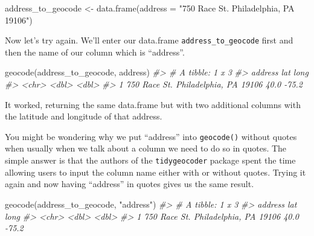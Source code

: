 \documentclass[
]{krantz}
\makeatletter
\newenvironment{Shaded}{\begin{snugshade}}{\end{snugshade}}
\newcommand{\AttributeTok}[1]{\textcolor[rgb]{0.61,0.61,0.61}{#1}}
\newcommand{\CommentTok}[1]{\textcolor[rgb]{0.37,0.37,0.37}{\textit{#1}}}
\newcommand{\FunctionTok}[1]{\textcolor[rgb]{0,0,0}{#1}}
\newcommand{\NormalTok}[1]{#1}
\newcommand{\OtherTok}[1]{\textcolor[rgb]{0.37,0.37,0.37}{#1}}
\newcommand{\StringTok}[1]{\textcolor[rgb]{0.5,0.5,0.5}{#1}}
\newenvironment{kframe}{%
\medskip{}
\setlength{\fboxsep}{.8em}
 \def\at@end@of@kframe{}%
 \ifinner\ifhmode%
  \def\at@end@of@kframe{\end{minipage}}%
  \begin{minipage}{\columnwidth}%
 \fi\fi%
 \def\FrameCommand##1{\hskip\@totalleftmargin \hskip-\fboxsep
 \colorbox{shadecolor}{##1}\hskip-\fboxsep
     \hskip-\linewidth \hskip-\@totalleftmargin \hskip\columnwidth}%
 \MakeFramed {\advance\hsize-\width
   \@totalleftmargin\z@ \linewidth\hsize
   \@setminipage}}%
 {\par\unskip\endMakeFramed%
 \at@end@of@kframe}
\renewenvironment{Shaded}{\begin{kframe}}{\end{kframe}}
\makeatother
\begin{document}
\begin{Shaded}
\begin{Highlighting}[]
\NormalTok{address\_to\_geocode }\OtherTok{\textless{}{-}} \FunctionTok{data.frame}\NormalTok{(}\AttributeTok{address =} 
                      \StringTok{"750 Race St. Philadelphia, PA 19106"}\NormalTok{)}
\end{Highlighting}
\end{Shaded}

Now let's try again. We'll enter our data.frame \texttt{address\_to\_geocode} first and then the name of our column which is ``address''.

\begin{Shaded}
\begin{Highlighting}[]
\FunctionTok{geocode}\NormalTok{(address\_to\_geocode, address)}
\CommentTok{\#\textgreater{} \# A tibble: 1 x 3}
\CommentTok{\#\textgreater{}   address                               lat  long}
\CommentTok{\#\textgreater{}   \textless{}chr\textgreater{}                               \textless{}dbl\textgreater{} \textless{}dbl\textgreater{}}
\CommentTok{\#\textgreater{} 1 750 Race St. Philadelphia, PA 19106  40.0 {-}75.2}
\end{Highlighting}
\end{Shaded}

It worked, returning the same data.frame but with two additional columns with the latitude and longitude of that address.

You might be wondering why we put ``address'' into \texttt{geocode()} without quotes when usually when we talk about a column we need to do so in quotes. The simple answer is that the authors of the \texttt{tidygeocoder} package spent the time allowing users to input the column name either with or without quotes. Trying it again and now having ``address'' in quotes gives us the same result.

\begin{Shaded}
\begin{Highlighting}[]
\FunctionTok{geocode}\NormalTok{(address\_to\_geocode, }\StringTok{"address"}\NormalTok{)}
\CommentTok{\#\textgreater{} \# A tibble: 1 x 3}
\CommentTok{\#\textgreater{}   address                               lat  long}
\CommentTok{\#\textgreater{}   \textless{}chr\textgreater{}                               \textless{}dbl\textgreater{} \textless{}dbl\textgreater{}}
\CommentTok{\#\textgreater{} 1 750 Race St. Philadelphia, PA 19106  40.0 {-}75.2}
\end{Highlighting}
\end{Shaded}
\end{document}
